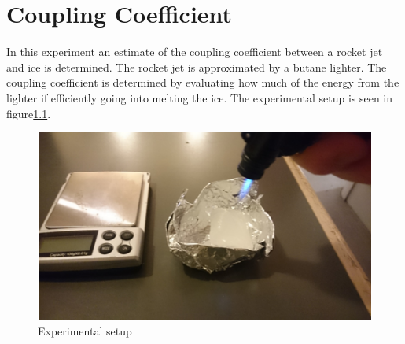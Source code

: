 \chapter{Coupling Coefficient}\label{app:coupling}

In this experiment an estimate of the coupling coefficient between a rocket jet and ice is determined. The rocket jet is approximated by a butane lighter. The coupling coefficient is determined by evaluating how much of the energy from the lighter if efficiently going into melting the ice. The experimental setup is seen in figure\ref{fig:coupling}.

\begin{figure}[htb]
\begin{center}
\includegraphics[scale=0.8]{figures/navtheory/coupling}
\caption{Experimental setup}
\label{fig:coupling}
\end{center}
\end{figure}


